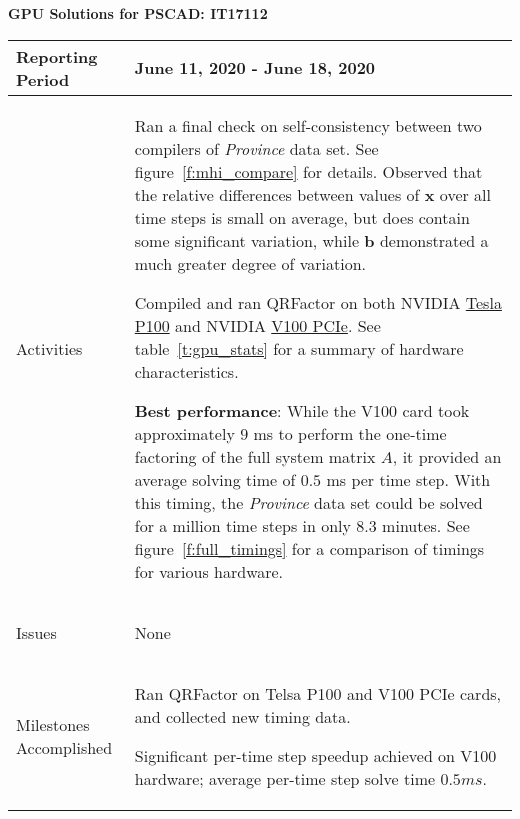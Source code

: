 \documentclass[11pt,letterpaper]{article}
\newcommand{\its}{\item[\tiny\textbullet]}
\begin{document}
\vspace{.2in}
\begin{center}
    {\bf GPU Solutions for PSCAD: IT17112}
\end{center}

	\vspace{.25in}

\begin{tabular}{| p{} | p{} |}
	\hline
	Reporting Period & June 11, 2020 - June 18, 2020 \\ \hline

	Activities & \begin{enumerate*}
    \item[\tiny\textbullet] Ran a final check on self-consistency between two compilers of \emph{Province} data set.
    See figure~\ref{f:mhi_compare} for details. Observed that the relative differences
    between values of $\mathbf{x}$ over all time steps is small on average, but does contain some
    significant variation, while $\mathbf{b}$ demonstrated a much greater degree of variation. \newline
    \its Compiled and ran QRFactor on both NVIDIA \href{https://images.nvidia.com/content/tesla/pdf/nvidia-tesla-p100-PCIe-datasheet.pdf}{Tesla P100} 
    and NVIDIA \href{https://images.nvidia.com/content/technologies/volta/pdf/volta-v100-datasheet-update-us-1165301-r5.pdf}{V100 PCIe}.
    See table~\ref{t:gpu_stats} for a summary of hardware characteristics. \newline
    \its {\bf Best performance}: While the V100 card took approximately $9$ ms to perform the one-time factoring of the 
    full system matrix $A$, it provided an average solving time of $0.5$ ms per time step. With this timing, 
    the \emph{Province} data set could be solved for a million time steps in only 8.3 minutes. See figure~\ref{f:full_timings} for 
    a comparison of timings for various hardware.
    \end{enumerate*} \\ \hline

	Issues & \begin{enumerate*}
	\item[\tiny\textbullet] None
	\end{enumerate*} \\ \hline

	Milestones \newline Accomplished & \begin{enumerate*}
	\item[\tiny\textbullet] Ran QRFactor on Telsa P100 and V100 PCIe cards, and collected new timing data. \newline
    \its Significant per-time step speedup achieved on V100 hardware; average per-time step solve time $0.5ms$.
    \end{enumerate*} \\ \hline


\end{tabular}
\end{document}
